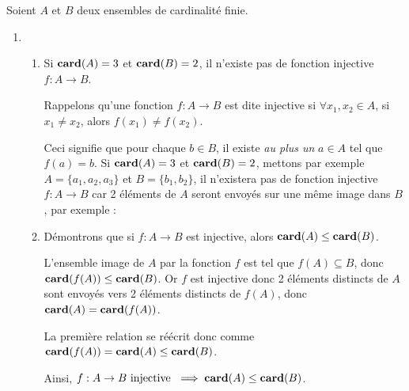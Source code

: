 \begin{exercice}
Soient $A$ et $B$ deux ensembles de cardinalité finie.

\begin{enumerate}
    
    \item
    \begin{enumerate}
        \item Si $\mathbf{card}(A)=3$ et $\mathbf{card}(B)=2$, il n'existe pas de fonction injective $f:A\rightarrow B$.

        Rappelons qu'une fonction $f : A \rightarrow B $ est dite injective si $\forall x_1, x_2 \in A$, si $x_1 \neq x_2$, alors $f(x_1) \neq f(x_2)$.
        
        Ceci signifie que pour chaque $b \in B$, il existe \textit{au plus un} $a \in A$ tel que $f(a) = b$. Si $\mathbf{card}(A)=3$ et $\mathbf{card}(B)=2$, mettons par exemple $A = \{a_1, a_2, a_3\}$ et $B = \{b_1, b_2\}$, il n'existera pas de fonction injective $f:A\rightarrow B$ car 2 éléments de $A$ seront envoyés sur une même image dans $B$, par exemple :

        \begin{center}
        \end{center}

        \item Démontrons que si $f:A\rightarrow B$ est injective, alors $\mathbf{card}(A) \leq \mathbf{card}(B)$.

        L'ensemble image de $A$ par la fonction $f$ est tel que $f(A) \subseteq B$, donc $\mathbf{card}(f(A)) \leq \mathbf{card}(B)$. Or $f$ est injective donc 2 éléments distincts de $A$ sont envoyés vers 2 éléments distincts de $f(A)$, donc $\mathbf{card}(A)=\mathbf{card}(f(A))$.
        
        La première relation se réécrit donc comme $\mathbf{card}(f(A)) = \mathbf{card}(A) \leq \mathbf{card}(B)$.

        Ainsi, $f:A\rightarrow B \text{ injective } \implies \mathbf{card}(A) \leq \mathbf{card}(B)$.\\


\end{enumerate}
\end{enumerate}
\end{exercice}
